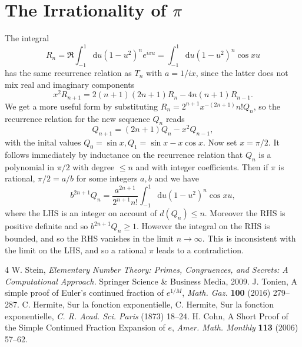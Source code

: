 \documentclass{article}
\theoremstyle{theorem}
\theoremstyle{definition}
\begin{document}
\section{The Irrationality of ${\pi}$} The integral
$$R_n= \Re \int_{-1}^1 \textrm{d}u (1-u^2 )^n e^{i xu} =\int_{-1}^1 \textrm{d}u (1-u^2 )^n \cos xu $$
has the same recurrence relation as $T_n$ with $a=1/ix$, since  the latter does not mix real and imaginary components
$$x^2 R_{n+1} 	= 2 (n+1) (2n + 1) R_n - 4 n(n+1) R_{n-1}.$$
We get a more useful form by substituting $R_n=  2^{n+1} x^{-(2n+1)}  n!  Q_n$, so the recurrence relation for the new sequence $Q_n$ reads
$$Q_{n+1} 	=  (2n + 1) Q_n -  x^2 Q_{n-1},$$
with the inital values $Q_0=\sin x, Q_1=\sin x -x \cos x$. Now set $x=\pi/2$. It follows immediately by inductance on the recurrence relation that $Q_n$ is a polynomial in $\pi/2$ with degree $\le n$ and with integer coefficients. Then if $\pi$ is rational, $\pi/2=a/b$ for some integers $a,b $ and we have 
$$ b^{2n+1}Q_n= \frac{a^{2n+1}}{2^{n+1} n!}\int_{-1}^1 \textrm{d}u (1-u^2 )^n \cos xu,$$
where the LHS is an integer on account of $d(Q_n) \le n$. Moreover the RHS is positive definite and so $b^{2n+1}Q_n\ge 1$. However the integral on the RHS is bounded, and so the RHS vanishes in the limit $n \to \infty$. This is inconsistent with the limit on the LHS, and so a rational $\pi$ leads to a contradiction.

\begin{thebibliography}{4}
	 W. Stein, {\it Elementary Number Theory: Primes, Congruences, and Secrets: A Computational Approach.\/} Springer Science \& Business Media, 2009.	
	 J. Tonien, A simple proof of Euler's continued fraction of $e^{1/M}$, {\it Math. Gaz.\/} {\bf 100} (2016) 279--287.
	 C. Hermite, Sur la fonction exponentielle, C. Hermite, Sur la fonction exponentielle, {\it C. R. Acad. Sci. Paris\/} (1873) 18--24.
	 H. Cohn, A Short Proof of the Simple Continued
	Fraction Expansion of $e$, {\it Amer. Math. Monthly\/} {\bf 113} (2006) 57--62.
\end{thebibliography}


\vfill\eject
\end{document}

